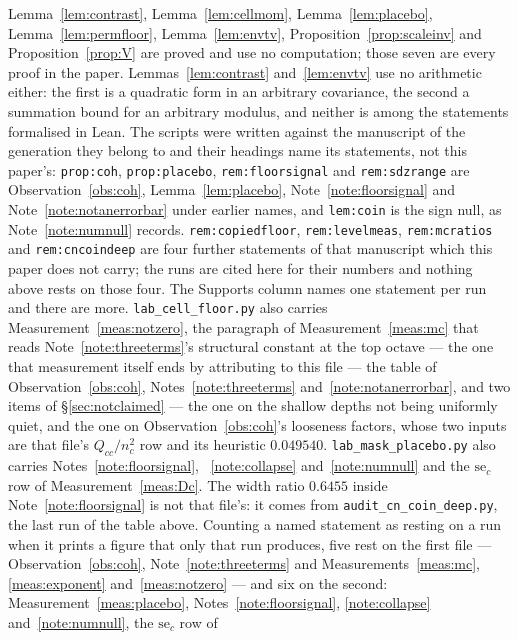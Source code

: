 \documentclass[11pt,a4paper]{article}
\theoremstyle{plain}
\theoremstyle{definition}
\theoremstyle{remark}
\begin{document}
Lemma~\ref{lem:contrast}, Lemma~\ref{lem:cellmom},
Lemma~\ref{lem:placebo}, Lemma~\ref{lem:permfloor},
Lemma~\ref{lem:envtv}, Proposition~\ref{prop:scaleinv} and
Proposition~\ref{prop:V} are proved and use no computation; those
seven are every proof in the paper.
Lemmas~\ref{lem:contrast} and~\ref{lem:envtv} use no arithmetic
either: the first is a quadratic form in an arbitrary covariance, the
second a summation bound for an arbitrary modulus, and neither is
among the statements formalised in Lean.
The scripts were written against the manuscript of the generation they
belong to and their headings name its statements, not this paper's:
\texttt{prop:coh}, \texttt{prop:placebo}, \texttt{rem:floorsignal} and
\texttt{rem:sdzrange} are Observation~\ref{obs:coh},
Lemma~\ref{lem:placebo}, Note~\ref{note:floorsignal} and
Note~\ref{note:notanerrorbar} under earlier names, and
\texttt{lem:coin} is the sign null, as Note~\ref{note:numnull}
records. \texttt{rem:copiedfloor}, \texttt{rem:levelmeas},
\texttt{rem:mcratios} and \texttt{rem:cncoindeep} are four further
statements of that manuscript which this paper does not carry; the
runs are cited here for their numbers and nothing above rests on
those four.
The Supports column names one statement per run and there are more.
\texttt{lab\_cell\_floor.py} also carries
Measurement~\ref{meas:notzero}, the paragraph of
Measurement~\ref{meas:mc} that reads
Note~\ref{note:threeterms}'s structural constant at the top octave
--- the one that measurement itself ends by attributing to this file
--- the table of
Observation~\ref{obs:coh}, Notes~\ref{note:threeterms}
and~\ref{note:notanerrorbar}, and two items of
\S\ref{sec:notclaimed} --- the one on the shallow depths not being
uniformly quiet, and the one on Observation~\ref{obs:coh}'s looseness
factors, whose two inputs are that file's $Q_{cc}/n_c^2$ row and its
heuristic $0.049540$.
\texttt{lab\_mask\_placebo.py} also carries
Notes~\ref{note:floorsignal}, ~\ref{note:collapse}
and~\ref{note:numnull} and the \(\mathrm{se}_c\) row of
Measurement~\ref{meas:Dc}. The width ratio $0.6455$ inside
Note~\ref{note:floorsignal} is not that file's: it comes from
\texttt{audit\_cn\_coin\_deep.py},
the last run of the table above. Counting a named statement as
resting on a run when it prints a figure that only that run produces,
five rest on the first file --- Observation~\ref{obs:coh},
Note~\ref{note:threeterms} and Measurements~\ref{meas:mc},
\ref{meas:exponent} and~\ref{meas:notzero} --- and six on the second:
Measurement~\ref{meas:placebo}, Notes~\ref{note:floorsignal},
\ref{note:collapse} and~\ref{note:numnull}, the $\mathrm{se}_c$ row of
\end{document}
